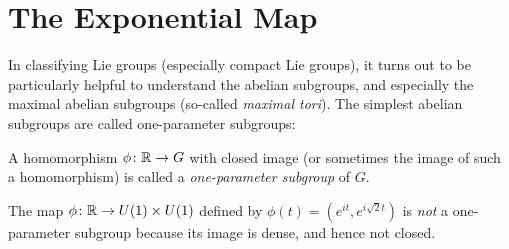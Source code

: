
\section{The Exponential Map}
\label{sec:exponential map}

In classifying Lie groups (especially compact Lie groups), it turns out to be particularly helpful to understand the abelian subgroups, and especially the maximal abelian subgroups (so-called \emph{maximal tori}). The simplest abelian subgroups are called one-parameter subgroups:

\begin{definition}\label{def:one-parameter subgroups}
	A homomorphism $\phi \colon\thinspace\! \mathbb{R} \to G$ with closed image (or sometimes the image of such a homomorphism) is called a \emph{one-parameter subgroup} of $G$.
\end{definition}

\begin{example}
	The map $\phi \colon\thinspace\! \mathbb{R} \to U(1) \times U(1)$ defined by $\phi(t) = \left(e^{it}, e^{i \sqrt{2}t}\right)$ is \emph{not} a one-parameter subgroup because its image is dense, and hence not closed.
\end{example}

